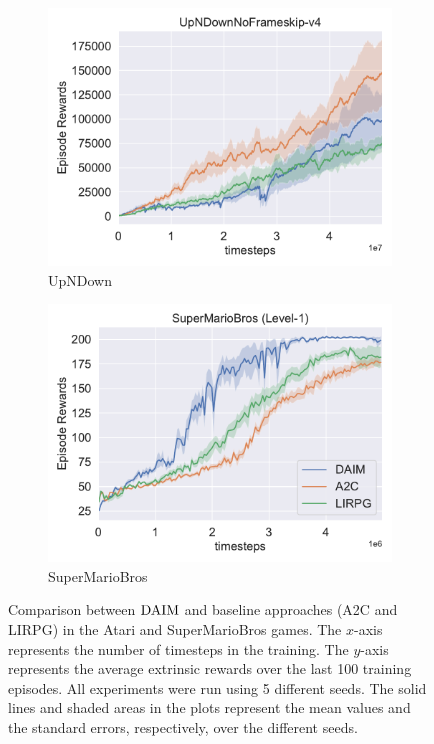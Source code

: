 \begin{figure}[h!]
\begin{subfigure}[t]{0.49\textwidth}
    \includegraphics[width=\textwidth]{figures/chapter5/atari_exp/upndown.pdf}
    \caption{UpNDown}
  \end{subfigure}\hfill
  \begin{subfigure}[t]{0.49\textwidth}
    \includegraphics[width=\textwidth]{figures/chapter5/atari_exp/SuperMarioBros.pdf}
    \caption{SuperMarioBros}
  \end{subfigure}\hfill
  \caption{Comparison between $\text{DAIM}$ and baseline approaches (A2C and LIRPG) in the Atari and SuperMarioBros games. The $x$-axis represents the number of timesteps in the training. The $y$-axis represents the average extrinsic rewards over the last 100  training episodes. All experiments were run using 5 different seeds. The solid lines and shaded areas in the plots represent the mean values and the standard errors, respectively, over the different seeds.} 
  \label{fig:atari_result}
\end{figure}


